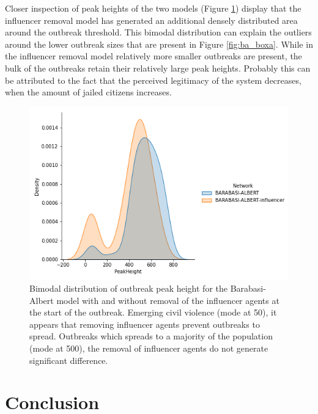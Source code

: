 \documentclass[10pt]{article}
\begin{document}
    Closer inspection of peak heights of the two models (Figure \ref{fig:inf_dens}) display that the influencer removal model has generated an additional densely distributed area around the outbreak threshold. This bimodal distribution can explain the outliers around the lower outbreak sizes that are present in Figure \ref{fig:ba_boxa}. While in the influencer removal model relatively more smaller outbreaks are present, the bulk of the outbreaks retain their relatively large peak heights. Probably this can be attributed to the fact that the perceived legitimacy of the system decreases, when the amount of jailed citizens increases.

    \begin{figure}
        \centering
        \includegraphics[width=.50\textwidth]{pictures/Results/only2density.png}
        \captionsetup{width=0.5\linewidth}
        \caption{Bimodal distribution of outbreak peak height for the Barabasi-Albert model with and without removal of the influencer agents at the start of the outbreak. Emerging civil violence (mode at 50), it appears that removing influencer agents prevent outbreaks to spread. Outbreaks which spreads to a majority of the population (mode at 500), the removal of influencer agents do not generate significant difference.}
        \label{fig:inf_dens}
    \end{figure}

    \newpage

    \section{Conclusion}
\end{document}
